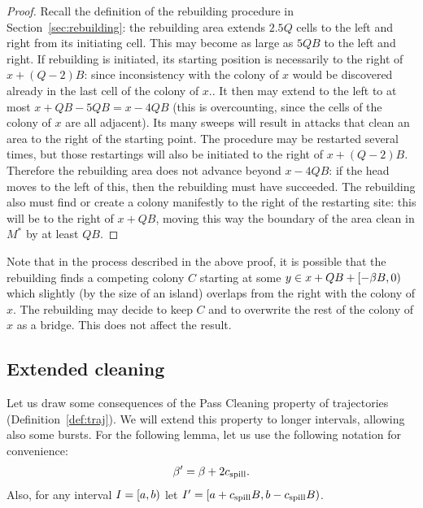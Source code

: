 \documentclass[12pt]{memoir}
\def\B{B}
\newcommand{\Q}{Q}
\newcommand{\cns}[1]{c_{\textrm{\upshape #1}}}
\newcommand{\CSpill}{\cns{spill}}
\begin{document}
\begin{proof}
Recall the definition of the rebuilding procedure in Section~\ref{sec:rebuilding}:
the rebuilding area extends \( 2.5\Q \) cells to the left and right from its initiating cell.
This may become as large as \( 5\Q\B \) to the left and right.
If rebuilding is initiated, its starting position
is necessarily to the right of \( x+(\Q-2)\B \): since inconsistency with
the colony of \( x \) would be discovered already in the last cell of the colony of \( x \)..
It then may extend to the left to at most \( x+\Q\B-5\Q\B=x-4\Q\B \) (this is overcounting,
since the cells of the colony of \( x \) are all adjacent).
Its many sweeps will result in attacks that clean an area to the right of the starting point.
The procedure may be restarted several times, but those restartings will also be initiated
to the right of \( x+(\Q-2)\B \).
Therefore the rebuilding area does not advance beyond \( x-4\Q\B \):
if the head moves to the left of this, then the rebuilding must have succeeded.
The rebuilding also must find or create a colony manifestly to the right of the restarting site: this will be
to the right of \( x+\Q\B \), moving this way the boundary of the area clean in \( M^{*} \) 
by at least \( \Q\B \).
\end{proof}

Note that in the process described in the above proof,
it is possible that the rebuilding finds a competing colony \( C \)
starting at some \( y \in x+\Q\B + \lint{-\beta\B}{0}\) which
slightly (by the size of an island) overlaps from the right with the colony of \( x \).
The rebuilding may decide to keep \( C \) and to overwrite the rest of the colony of \( x \) as a bridge.
This does not affect the result.

\subsection{Extended cleaning}\label{sec:extended-cleaning}

Let us draw some consequences of the Pass Cleaning property of trajectories (Definition~\ref{def:traj}).
We will extend this property to longer intervals, allowing also  some bursts.
For the following lemma, let us use the following notation for convenience:
\begin{align*}
   \beta'=\beta+2\CSpill.
 \end{align*}
Also, for any interval \( I=\left[a,b\right) \) let \( I'=\lint{a+\CSpill\B}{b-\CSpill\B} \).
\end{document}
